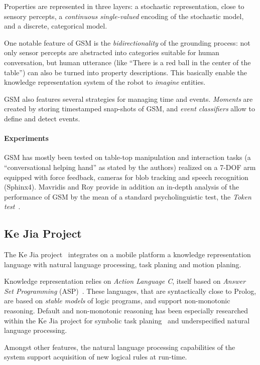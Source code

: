 Properties are represented in three layers: a stochastic representation, close
to sensory percepts, a \emph{continuous single-valued} encoding of the
stochastic model, and a discrete, categorical model.

One notable feature of GSM is the \emph{bidirectionality} of the grounding
process: not only sensor percepts are abstracted into categories suitable for
human conversation, but human utterance (like ``There is a red ball in the
center of the table'') can also be turned into property descriptions. This
basically enable the knowledge representation system of the robot to
\emph{imagine} entities.

GSM also features several strategies for managing time and events.
\emph{Moments} are created by storing timestamped snap-shots of GSM, and
\emph{event classifiers} allow to define and detect events.

\paragraph{Experiments} GSM has mostly been tested on table-top manipulation
and interaction tasks (a ``conversational helping hand'' as stated by the
authors) realized on a 7-DOF arm equipped with force feedback, cameras for blob
tracking and speech recognition (Sphinx4). Mavridis and Roy provide in addition
an in-depth analysis of the performance of GSM by the mean of a standard
psycholinguistic test, the \emph{Token test}~\cite{DiSimoni1978}.

\subsection{Ke Jia Project}
\label{sect|kejia}

The Ke Jia project~\cite{Chen2010} integrates on a mobile platform a knowledge
representation language with natural language processing, task planing and
motion planing.

Knowledge representation relies on \emph{Action Language C}, itself based on
\emph{Answer Set Programming} (ASP)~\cite{Gelfond2008}. These languages, that
are syntactically close to Prolog, are based on \emph{stable models} of logic
programs, and support non-monotonic reasoning. Default and non-monotonic
reasoning has been especially researched within the Ke Jia project for symbolic
task planing~\cite{Ji2011} and underspecified natural language processing.

Amongst other features, the natural language processing capabilities of the
system support acquisition of new logical rules at run-time.

